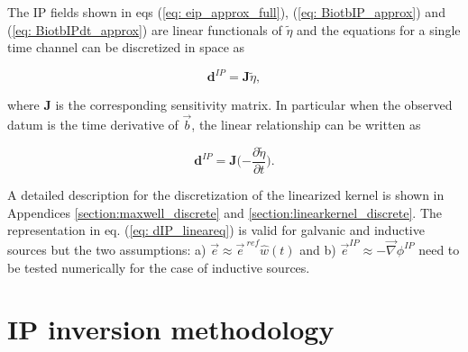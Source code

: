\documentclass[extra,mreferee]{gji}
\newcommand{\grad}{\vec \nabla}
\renewcommand {\b}  { {\vec b} }
\newcommand {\e}  { {\vec e} }
\newcommand{\peta}{\tilde{\eta}}
\newcommand{\eref}{\e^{\ ref}}
\begin{document}
The IP fields shown in eqs (\ref{eq: eip_approx_full}), (\ref{eq: BiotbIP_approx}) and (\ref{eq: BiotbIPdt_approx}) are linear functionals of $\peta$ and the equations for a single time channel can be discretized in space as
\begin{linenomath*}
\begin{equation}
  \mathbf{d}^{IP} = \mathbf{J}\peta,
  \label{eq: dIP_lineareq}
\end{equation}
\end{linenomath*}
where $\mathbf{J}$ is the corresponding sensitivity matrix. 
In particular when the observed datum is the time derivative of $\b$, the linear relationship can be written as 
\begin{linenomath*}
\begin{equation}
  \mathbf{d}^{IP} = \mathbf{J}(-\frac{\partial \peta}{\partial t}\Big).
  \label{eq: dIP_lineareq_dbdt}
\end{equation}
\end{linenomath*}
A detailed description for the discretization of the linearized kernel is shown in Appendices \ref{section:maxwell_discrete} and \ref{section:linearkernel_discrete}. 
The representation in eq. (\ref{eq: dIP_lineareq}) is valid for galvanic and inductive sources but the two assumptions: a) $\e \approx \eref \hat{w}(t)$ and b) $\e^{IP} \approx -\grad\phi^{IP}$ need to be tested numerically for the case of inductive sources. 


\section{IP inversion methodology}
\end{document}
